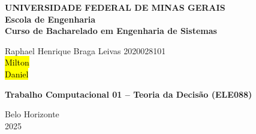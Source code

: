 \begin{center}
\textbf{UNIVERSIDADE FEDERAL DE MINAS GERAIS\\
Escola de Engenharia \\
Curso de Bacharelado em Engenharia de Sistemas}

\vspace{4cm}

Raphael Henrique Braga Leivas 2020028101 \\
\hl{Milton} \\
\hl{Daniel}

\vspace{4cm}  

{ \textbf{Trabalho Computacional 01 – Teoria da Decisão (ELE088)} }

\vfill
{Belo Horizonte \\
2025 }
\end{center}

\newpage